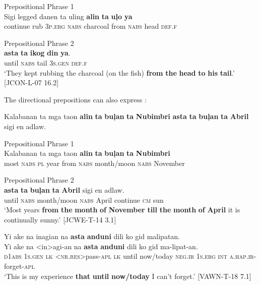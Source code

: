 \hspace{5.8cm} Prepositional Phrase 1 \\
\gll Sigi  legged  danen  ta  uling  \textbf{alin}  \textbf{ta}  \textbf{uļo} \textbf{ya} \\
continue  rub  3\textsc{p.erg}  \textsc{nabs}  charcoal  from  \textsc{nabs}  head  \textsc{def.f} \\\smallskip

 Prepositional Phrase 2 \\
\gll \textbf{asta}  \textbf{ta}  \textbf{ikog}  \textbf{din}  \textbf{ya}. \\
until  \textsc{nabs}  tail  3\textsc{s.gen}  \textsc{def.f} \\
\glt `They kept rubbing the charcoal (on the fish) \textbf{from} \textbf{the} \textbf{head} \textbf{to} \textbf{his} \textbf{tail}.’ [JCON-L-07 16.2]
\z

The directional prepositions can also express :

\ea
Kalabanan  ta  mga  taon  \textbf{alin}  \textbf{ta}  \textbf{buļan}  \textbf{ta}  \textbf{Nubimbri} \textbf{asta}  \textbf{ta}  \textbf{buļan}  \textbf{ta}  \textbf{Abril}  sigi  en  adlaw. \\\smallskip

\hspace{4.1cm} Prepositional Phrase 1 \\
\gll Kalabanan  ta  mga  taon  \textbf{alin}  \textbf{ta}  \textbf{buļan}  \textbf{ta}  \textbf{Nubimbri} \\
most  \textsc{nabs}  \textsc{pl}  year  from  \textsc{nabs}  month/moon  \textsc{nabs}  November \\\smallskip

 Prepositional Phrase 2 \\
\gll \textbf{asta}  \textbf{ta}  \textbf{buļan}  \textbf{ta}  \textbf{Abril}  sigi  en  adlaw. \\
until  \textsc{nabs}  month/moon  \textsc{nabs}  April  continue  \textsc{cm}  sun \\
\glt `Most years \textbf{from} \textbf{the} \textbf{month} \textbf{of} \textbf{November} \textbf{till} \textbf{the} \textbf{month} \textbf{of} \textbf{April} it is continually sunny.’ [JCWE-T-14 3.1]
\z

\newpage
\ea
Yi  ake  na  inagian  na  \textbf{asta}  \textbf{anduni}  dili  ko gid  malipatan. \\\smallskip
 \gll Yi  ake  na  <in>agi-an  na  \textbf{asta}  \textbf{anduni}  dili  ko gid  ma-lipat-an. \\
\textsc{d}1\textsc{abs}  1\textsc{s.gen}  \textsc{lk}  <\textsc{nr.res}>pass-\textsc{apl}  \textsc{lk}  until  now/today  \textsc{neg.ir}  1\textsc{s.erg}
\textsc{int}  \textsc{a.hap.ir}-forget-\textsc{apl} \\
\glt `This is my experience \textbf{that} \textbf{until} \textbf{now/today} I can’t forget.’ [VAWN-T-18 7.1] 
\z


